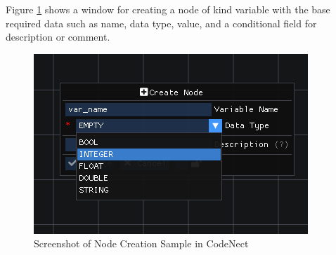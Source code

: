 \parx
Figure \ref{fig:cn_node_create} shows a window for creating a node of kind
variable with the base required data such as name, data type, value, and a
conditional field for description or comment.

\begin{figure}[H]
	\centering
	\captionsetup{justification=centering}
	\captionsetup[figure]{list=yes}
	\includegraphics[width=\linewidth]{media/sc_node_creation_sample.png}
	\caption[Screenshot of Node Creation Sample in CodeNect]{Screenshot of Node Creation Sample in CodeNect}
	\label{fig:cn_node_create}
\end{figure}
